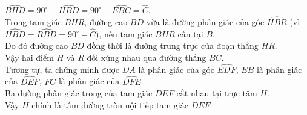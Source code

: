 \begin{bt}
{\begin{enumerate}[a)]
	$\widehat{BHD} = 90^\circ - \widehat{HBD} = 90^\circ - \widehat{EBC} = \widehat{C}$.\\
	Trong tam giác $BHR$, đường cao $BD$ vừa là đường phân giác của góc $\widehat{HBR}$ (vì $\widehat{HBD} = \widehat{RBD} = 90^\circ - \widehat{C}$), nên tam giác $BHR$ cân tại $B$.\\
	Do đó đường cao $BD$ đồng thời là đường trung trực của đoạn thẳng $HR$.\\
	Vậy hai điểm $H$ và $R$ đối xứng nhau qua đường thẳng $BC$.\\
	Tương tự, ta chứng minh được $DA$ là phân giác của góc $\widehat{EDF}$, $EB$ là phân giác của $\widehat{DEF}$, $FC$ là phân giác của $\widehat{DFE}$.\\
	Ba đường phân giác trong của tam giác $DEF$ cắt nhau tại trực tâm $H$.\\
	Vậy $H$ chính là tâm đường tròn nội tiếp tam giác $DEF$.
\end{enumerate}
}
\end{bt}

